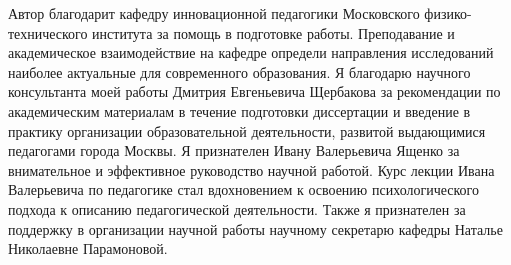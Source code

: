 Автор благодарит кафедру инновационной педагогики Московского физико-технического института за помощь 
в подготовке работы. Преподавание и академическое взаимодействие на кафедре определи направления исследований
наиболее актуальные для современного образования. Я благодарю научного консультанта моей
работы Дмитрия Евгеньевича Щербакова за рекомендации по академическим материалам в течение подготовки диссертации 
и введение в практику организации образовательной деятельности, развитой выдающимися педагогами города Москвы. 
Я признателен Ивану Валерьевича Ященко за внимательное и эффективное руководство научной работой. Курс лекции
Ивана Валерьевича по педагогике стал вдохновением к освоению психологического подхода к описанию педагогической
деятельности. Также я признателен за поддержку в организации научной работы научному секретарю 
кафедры Наталье Николаевне Парамоновой.
